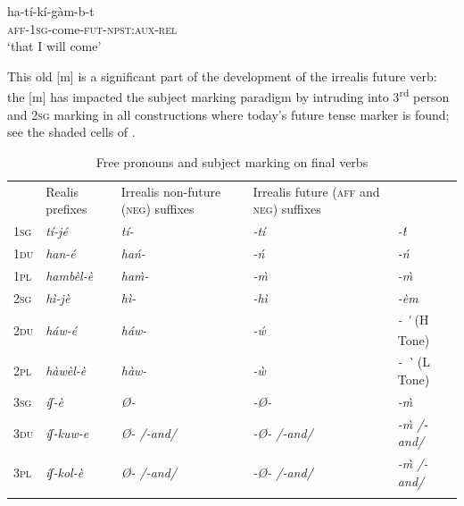 \documentclass[output=paper]{langsci/langscibook}
\begin{document}
\ea\label{ex:mahland:77}
\gll ha-tí-kí-gàm-b-t\\
  \textsc{aff-1sg}{}-come-\textsc{fut-npst:aux-rel}\\\glt `that I will come'
\z

This old [m] is a significant part of the development of the irrealis future verb: the [m] has impacted the subject marking paradigm by intruding into 3\textsuperscript{rd} person and \textsc{2sg} marking in all constructions where today's future tense marker is found; see the shaded cells of . 

\begin{table}
\caption{Free pronouns and subject marking on final verbs \citep[7]{Ahland2014b}}
\label{tab:mahland:7}
\begin{tabularx}{\textwidth}{XXXXX}
\lsptoprule

\multicolumn{2}{X}{\mdseries Free pronouns} & \mdseries Realis prefixes & \mdseries Irrealis non-future (\textsc{neg}) suffixes & \mdseries Irrealis future (\textsc{aff} and \textsc{neg}) suffixes\\
\mdseries \textsc{1sg} & \itshape tí-jé & \itshape tí- & \itshape {}-tí & \itshape {}-\'{t}\\
\mdseries \textsc{1du} & \itshape han-é & \itshape ha\'{n}- & \itshape {}-\'{n} & \itshape {}-\'{n}\\
\mdseries \textsc{1pl} & \itshape hambèl-è & \itshape ha\`{m}- & \itshape {}-\`{m} & \itshape {}-\`{m}\\
\mdseries \textsc{2sg} & \itshape hì-jè & \itshape hì- & \itshape {}-hì & \itshape {}-èm \\
\mdseries \textsc{2du} & \itshape háw-é & \itshape háw- & \itshape {}-\'{w} & \mdseries \textit{{}-} \textit{\textsubscript{}} \textit{ \'{}}   (H Tone)\\
\mdseries \textsc{2pl} & \itshape hàwèl-è & \itshape hàw- & \itshape {}-\`{w} & \mdseries \textit{{}-   \`{}}   (L Tone)\\
\mdseries \textsc{3sg} & \itshape íʃ-è & \itshape Ø- & \itshape {}-Ø- & \itshape {}-\`{m}\\
\mdseries \textsc{3du} & \itshape íʃ-kuw-e & \itshape Ø-   /-and/ & \itshape {}-Ø-   /-and/ & \itshape {}-\`{m}     /-and/\\
\mdseries \textsc{3pl} & \itshape íʃ-kol-è & \itshape Ø-   /-and/ & \itshape {}-Ø-   /-and/ & \itshape {}-\`{m}    /-and/\\
\lspbottomrule
\end{tabularx}
\end{table}
\end{document}
